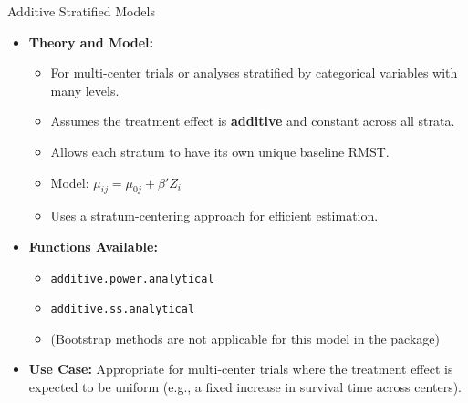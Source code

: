 \documentclass{beamer}
\begin{document}
\begin{frame}{Additive Stratified Models}
\begin{itemize}
    \item \textbf{Theory and Model:}
    \begin{itemize}
        \item For multi-center trials or analyses stratified by categorical variables with many levels.
        \item Assumes the treatment effect is \textbf{additive} and constant across all strata.
        \item Allows each stratum to have its own unique baseline RMST.
        \item Model: $\mu_{ij} = \mu_{0j} + \beta'Z_i$
        \item Uses a stratum-centering approach for efficient estimation.
    \end{itemize}
    \item \textbf{Functions Available:}
    \begin{itemize}
        \item \texttt{additive.power.analytical}
        \item \texttt{additive.ss.analytical}
        \item (Bootstrap methods are not applicable for this model in the package)
    \end{itemize}
    \item \textbf{Use Case:} Appropriate for multi-center trials where the treatment effect is expected to be uniform (e.g., a fixed increase in survival time across centers).
\end{itemize}
\end{frame}
\end{document}
